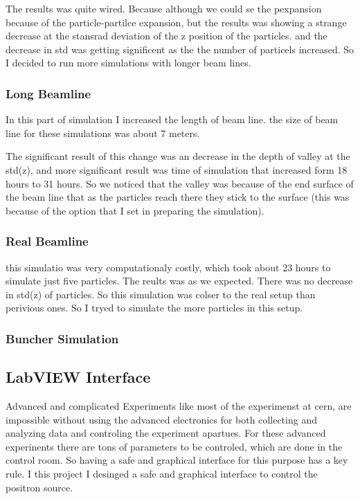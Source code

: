 \documentclass{article}
\begin{document}
The results was quite wired. Because although we could se the pexpansion because of the particle-partilce expansion, but the results was showing a strange decrease at the  stansrad deviation of the z position of the particles. and the decrease in std was getting significent as the the number of particels increased. So I decided to run more simulations with longer beam lines.

\subsubsection{Long Beamline}
In this part of simulation I increased the length of beam line. the size of beam line for these simulations was about 7 meters. 

The significant result of this change was an decrease in the depth of valley at the std(z), and more significant result was time of simulation that increased form 18 hours to 31 hours.
 So we noticed that the valley was because of the end surface of the beam line that as the particles reach there they stick to the surface (this was because of the option that I set in preparing the simulation).
 
\subsubsection{Real Beamline}
this simulatio was very computationaly costly, which took about 23 hours to simulate just five particles. The reults was as we expected. There was no decrease in std(z) of particles. So this simulation was colser to the real setup than perivious ones. So I tryed to simulate the more particles in this setup.

\subsubsection{Buncher Simulation}



\subsection{LabVIEW Interface}
Advanced and complicated Experiments like most of the experimenst at cern, are impossible without using the advanced electronics for both collecting and analyzing data and controling the experiment apartues. For these advanced experinents there are tons of parameters to be controled, which are done in the control room. 
So having a safe and graphical interface for this purpose has a key rule. I this project I desinged a safe and graphical interface to control the positron source.
\end{document}
